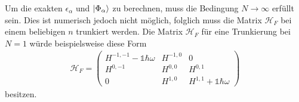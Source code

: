 Um die exakten $\epsilon_{\alpha}$ und $\ket{\Phi_\alpha}$ zu berechnen, muss die Bedingung
$N\rightarrow\infty $
erfüllt sein.
Dies ist numerisch jedoch nicht möglich, folglich muss die Matrix $\mathcal{H}_F$ bei einem beliebigen $n$ trunkiert werden.
Die Matrix $\mathcal{H}_F$ für eine Trunkierung bei $N=1$ würde beispielsweise diese Form
\begin{align}
  \mathcal{H}_F=\begin{pmatrix}
  H^{-1,-1}-\mathbb{1}\hbar\omega &  H^{-1,0} &   0 \\
  H^{0,-1}               &  H^{0,0}  &H^{0,1}                  \\
      0                  &  H^{1,0}  & H^{1,1}+\mathbb{1}\hbar\omega
\end{pmatrix}
\end{align}
besitzen.
